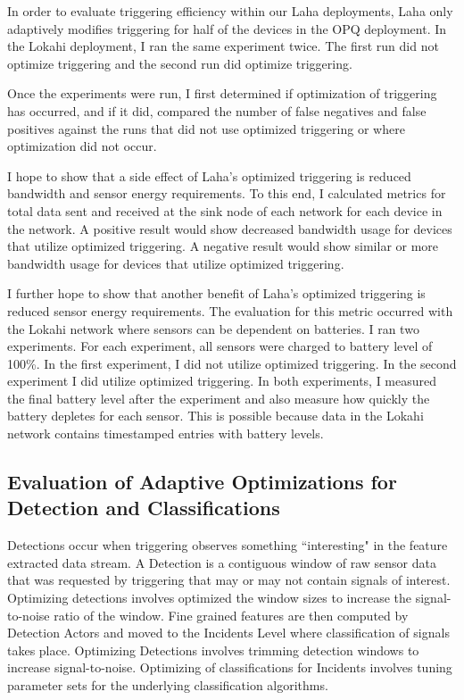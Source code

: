 In order to evaluate triggering efficiency within our Laha deployments, Laha only adaptively modifies triggering for half of the devices in the OPQ deployment. In the Lokahi deployment, I  ran the same experiment twice. The first run did not optimize triggering and the second run did optimize triggering.

Once the experiments were run, I first determined if optimization of triggering has occurred, and if it did, compared the number of false negatives and false positives against the runs that did not use optimized triggering or where optimization did not occur.

I hope to show that a side effect of Laha's optimized triggering is reduced bandwidth and sensor energy requirements. To this end, I calculated metrics for total data sent and received at the sink node of each network for each device in the network. A positive result would show decreased bandwidth usage for devices that utilize optimized triggering. A negative result would show similar or more bandwidth usage for devices that utilize optimized triggering.

I further hope to show that another benefit of Laha's optimized triggering is reduced sensor energy requirements. The evaluation for this metric occurred with the Lokahi network where sensors can be dependent on batteries. I ran two experiments. For each experiment, all sensors were charged to battery level of 100\%. In the first experiment, I did not utilize optimized triggering. In the second experiment I did utilize optimized triggering. In both experiments, I measured the final battery level after the experiment and also measure how quickly the battery depletes for each sensor. This is possible because data in the Lokahi network contains timestamped entries with battery levels.

\subsection{Evaluation of Adaptive Optimizations for Detection and Classifications}\label{subsec:evaluation-of-adaptive-optimizations-for-detection-and-classifications}
Detections occur when triggering observes something ``interesting" in the feature extracted data stream. A Detection is a contiguous window of raw sensor data that was requested by triggering that may or may not contain signals of interest. Optimizing detections involves optimized the window sizes to increase the signal-to-noise ratio of the window. Fine grained features are then computed by Detection Actors and moved to the Incidents Level where classification of signals takes place. Optimizing Detections involves trimming detection windows to increase signal-to-noise. Optimizing of classifications for Incidents involves tuning parameter sets for the underlying classification algorithms.

